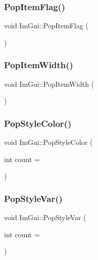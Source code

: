 \subsubsection{\texorpdfstring{Pop\+Item\+Flag()}{PopItemFlag()}}
{\footnotesize\ttfamily void Im\+Gui\+::\+Pop\+Item\+Flag (\begin{DoxyParamCaption}{ }\end{DoxyParamCaption})}

\hypertarget{namespace_im_gui_ad29a3fc0cb5dfc7f9fc7224512ce90bf}{}\label{namespace_im_gui_ad29a3fc0cb5dfc7f9fc7224512ce90bf} 
\subsubsection{\texorpdfstring{Pop\+Item\+Width()}{PopItemWidth()}}
{\footnotesize\ttfamily void Im\+Gui\+::\+Pop\+Item\+Width (\begin{DoxyParamCaption}{ }\end{DoxyParamCaption})}

\hypertarget{namespace_im_gui_a9795f730b4043a98b6254738d86efcdc}{}\label{namespace_im_gui_a9795f730b4043a98b6254738d86efcdc} 
\subsubsection{\texorpdfstring{Pop\+Style\+Color()}{PopStyleColor()}}
{\footnotesize\ttfamily void Im\+Gui\+::\+Pop\+Style\+Color (\begin{DoxyParamCaption}\item[{int}]{count = {} }\end{DoxyParamCaption})}

\hypertarget{namespace_im_gui_a14116e57d81e326adef2a702e65781d4}{}\label{namespace_im_gui_a14116e57d81e326adef2a702e65781d4} 
\subsubsection{\texorpdfstring{Pop\+Style\+Var()}{PopStyleVar()}}
{\footnotesize\ttfamily void Im\+Gui\+::\+Pop\+Style\+Var (\begin{DoxyParamCaption}\item[{int}]{count = {} }\end{DoxyParamCaption})}

